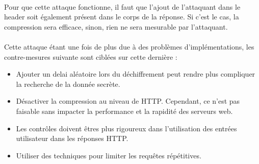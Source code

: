 \paragraph{}
Pour que cette attaque fonctionne, il faut que l'ajout de l'attaquant dans le header soit également présent dans le corps de la réponse. Si c'est le cas, la compression sera efficace, sinon, rien ne sera mesurable par l'attaquant.

\paragraph{}
Cette attaque étant une fois de plus due à des problèmes d'implémentations, les contre-mesures suivante sont ciblées sur cette dernière :
\begin{itemize}
  \item Ajouter un delai aléatoire lors du déchiffrement peut rendre plus compliquer la recherche de la donnée secrète.
  \item Désactiver la compression au niveau de HTTP. Cependant, ce n'est pas faisable sans impacter la performance et la rapidité des serveurs web.
  \item Les contrôles doivent êtres plus rigoureux dans l'utilisation des entrées utilisateur dans les réponses HTTP.
  \item Utiliser des techniques pour limiter les requêtes répétitives.
\end{itemize}
